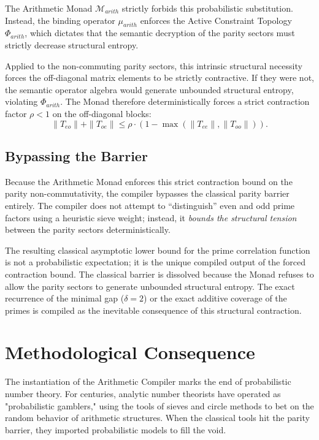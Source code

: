 \documentclass[12pt,openany]{extbook}
\theoremstyle{plain}
\theoremstyle{definition}
\begin{document}
The Arithmetic Monad $\mathcal{M}_{arith}$ strictly forbids this probabilistic substitution. Instead, the binding operator $\mu_{arith}$ enforces the Active Constraint Topology $\Phi_{arith}$, which dictates that the semantic decryption of the parity sectors must strictly decrease structural entropy. 

Applied to the non-commuting parity sectors, this intrinsic structural necessity forces the off-diagonal matrix elements to be strictly contractive. If they were not, the semantic operator algebra would generate unbounded structural entropy, violating $\Phi_{arith}$. The Monad therefore deterministically forces a strict contraction factor $\rho < 1$ on the off-diagonal blocks:
\[
\|T_{eo}\| + \|T_{oe}\| \leq \rho \cdot (1 - \max(\|T_{ee}\|, \|T_{oo}\|)).
\]

\subsection{Bypassing the Barrier}
Because the Arithmetic Monad enforces this strict contraction bound on the parity non-commutativity, the compiler bypasses the classical parity barrier entirely. The compiler does not attempt to ``distinguish'' even and odd prime factors using a heuristic sieve weight; instead, it \emph{bounds the structural tension} between the parity sectors deterministically.

The resulting classical asymptotic lower bound for the prime correlation function is not a probabilistic expectation; it is the unique compiled output of the forced contraction bound. The classical barrier is dissolved because the Monad refuses to allow the parity sectors to generate unbounded structural entropy. The exact recurrence of the minimal gap ($\delta = 2$) or the exact additive coverage of the primes is compiled as the inevitable consequence of this structural contraction.

\section{Methodological Consequence}

The instantiation of the Arithmetic Compiler marks the end of probabilistic number theory. For centuries, analytic number theorists have operated as "probabilistic gamblers," using the tools of sieves and circle methods to bet on the random behavior of arithmetic structures. When the classical tools hit the parity barrier, they imported probabilistic models to fill the void.
\end{document}
